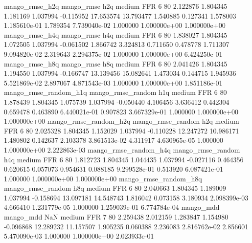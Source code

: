        mango_rmse_h2q        mango_rmse                  h2q     medium      FFR                 6 80  2.122876       1.804345 1.181169       1.037994   -0.115952     17.653574     13.793477     1.540885       0.127341  1.578003 1.185610e-01     1.789354   7.739040e-02            1.000000    1.000000e+00        1.000000e+00
       mango_rmse_h4q        mango_rmse                  h4q     medium      FFR                 6 80  1.838027       1.804345 1.072505       1.037994   -0.061502      1.866742      3.324813     0.711650       0.478778  1.711307 9.094820e-02     2.319643   2.294375e-02            1.000000    1.000000e+00        6.424250e-01
       mango_rmse_h8q        mango_rmse                  h8q     medium      FFR                 6 80  2.041426       1.804345 1.194550       1.037994   -0.166747     13.139456     15.082641     1.473034       0.144715  1.945936 5.521869e-02     2.897067   4.871543e-03            1.000000    1.000000e+00        1.851186e-01
mango_rmse_random_h1q mango_rmse_random                  h1q     medium      FFR                 6 80  1.878439       1.804345 1.075739       1.037994   -0.050440      4.106456      3.636412     0.442304       0.659478  0.463890 6.440021e-01     0.907823   3.667329e-01            1.000000    1.000000e+00        1.000000e+00
mango_rmse_random_h2q mango_rmse_random                  h2q     medium      FFR                 6 80  2.025328       1.804345 1.152029       1.037994   -0.110228     12.247272     10.986171     1.480802       0.142637  2.103378 3.861513e-02     4.311917   4.630965e-05            1.000000    1.000000e+00        2.222863e-03
mango_rmse_random_h4q mango_rmse_random                  h4q     medium      FFR                 6 80  1.812723       1.804345 1.044435       1.037994   -0.027116      0.464356      0.620615     0.057073       0.954631  0.088185 9.299528e-01     0.513920   6.087421e-01            1.000000    1.000000e+00        1.000000e+00
mango_rmse_random_h8q mango_rmse_random                  h8q     medium      FFR                 6 80  2.040663       1.804345 1.189009       1.037994   -0.158694     13.097181     14.548743     1.816042       0.073158  3.180934 2.098399e-03     4.666410   1.231779e-05            1.000000    1.259039e-01        6.774784e-04
            mango_mdd         mango_mdd                  NaN     medium      FFR                 7 80  2.259438       2.012159 1.283847       1.154980   -0.096868     12.289232     11.157507     1.905235       0.060388  2.236083 2.816762e-02     2.856601   5.470090e-03            1.000000    1.000000e+00        2.023933e-01
